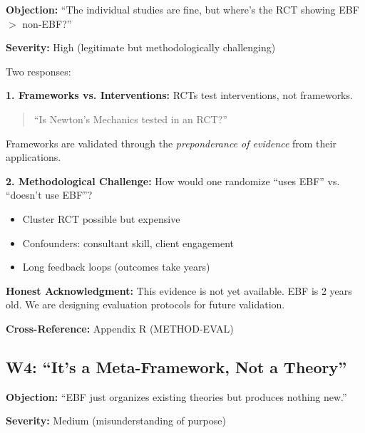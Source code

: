 \begin{tcolorbox}[colback=gray!5!white, colframe=gray!75!black]
\textbf{Objection:} ``The individual studies are fine, but where's the RCT showing EBF $>$ non-EBF?''

\textbf{Severity:} High (legitimate but methodologically challenging)
\end{tcolorbox}

\begin{axiom}
Two responses:

\textbf{1. Frameworks vs. Interventions:}
RCTs test interventions, not frameworks.
\begin{quote}
``Is Newton's Mechanics tested in an RCT?''
\end{quote}
Frameworks are validated through the \textit{preponderance of evidence} from their applications.

\textbf{2. Methodological Challenge:}
How would one randomize ``uses EBF'' vs. ``doesn't use EBF''?
\begin{itemize}[nosep]
    \item Cluster RCT possible but expensive
    \item Confounders: consultant skill, client engagement
    \item Long feedback loops (outcomes take years)
\end{itemize}

\textbf{Honest Acknowledgment:} This evidence is not yet available. EBF is 2 years old.
We are designing evaluation protocols for future validation.
\end{axiom}

\textbf{Cross-Reference:} Appendix R (METHOD-EVAL)

\subsection{W4: ``It's a Meta-Framework, Not a Theory''}
\label{sec:da-w4}

\begin{tcolorbox}[colback=gray!5!white, colframe=gray!75!black]
\textbf{Objection:} ``EBF just organizes existing theories but produces nothing new.''

\textbf{Severity:} Medium (misunderstanding of purpose)
\end{tcolorbox}

